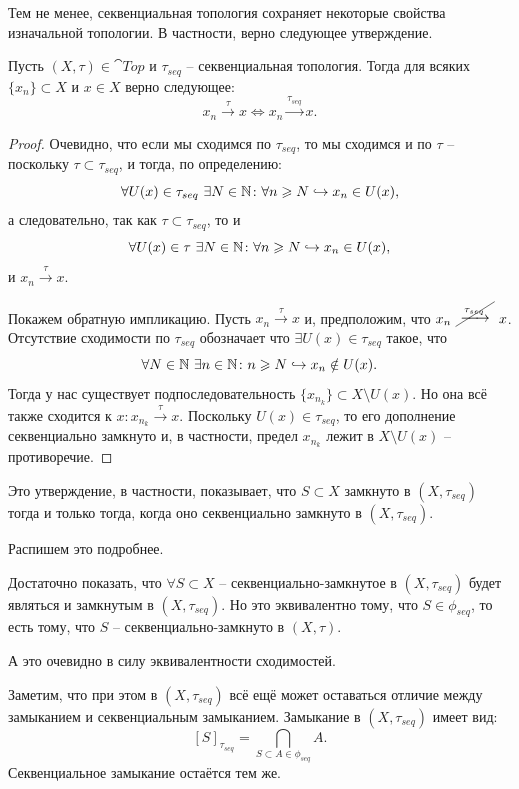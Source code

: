Тем не менее, секвенциальная топология сохраняет некоторые свойства изначальной топологии.
В частности, верно следующее утверждение.
\begin{proposition}
    Пусть $(X, \tau) \in \cat{Top}$ и $\tau_{seq}$ -- секвенциальная топология.
    Тогда для всяких $\{x_n\} \subset X$ и $x \in X$ верно следующее:
    \[
        x_n \xrightarrow{\tau} x \Longleftrightarrow x_n \xrightarrow{\tau_{seq}} x.
    \]
\end{proposition}
\begin{proof}
    Очевидно, что если мы сходимся по $\tau_{seq}$, то мы сходимся и по $\tau$ -- поскольку $\tau \subset \tau_{seq}$, и тогда, по определению:
    \[
        \forall U(x) \in \tau_{seq} \ \exists N \in \mathbb{N}\colon \forall n \geqslant N \hookrightarrow x_n \in U(x),
    \]
    а следовательно, так как $\tau \subset \tau_{seq}$, то и
    \[
        \forall U(x) \in \tau \ \exists N \in \mathbb{N} \colon \forall n \geqslant N \hookrightarrow x_n \in U(x),
    \]
    и $x_n \xrightarrow{\tau} x$.

    Покажем обратную импликацию.
    Пусть $x_n \xrightarrow{\tau} x$ и, предположим, что $x_n \xcancelrightarrow{\tau_{seq}} x$.
    Отсутствие сходимости по $\tau_{seq}$ обозначает что $\exists U(x) \in \tau_{seq}$ такое, что
    \[
        \forall N \in \mathbb{N} \ \exists n \in \mathbb{N}\colon n \geqslant N \hookrightarrow x_n \notin U(x).
    \]
    Тогда у нас существует подпоследовательность $\{x_{n_k}\} \subset X \setminus U(x)$.
    Но она всё также сходится к $x\colon x_{n_k} \xrightarrow{\tau} x$.
    Поскольку $U(x) \in \tau_{seq}$, то его дополнение секвенциально замкнуто и, в частности, предел $x_{n_k}$ лежит в $X \setminus U(x)$ -- противоречие.
\end{proof}
\begin{note}
    Это утверждение, в частности, показывает, что $S \subset X$ замкнуто в $(X, \tau_{seq})$ тогда и только тогда, когда оно секвенциально замкнуто в $(X, \tau_{seq})$.

    Распишем это подробнее.
    
    Достаточно показать, что $\forall S \subset X$ -- секвенциально-замкнутое в $(X, \tau_{seq})$ будет являться и замкнутым в $(X, \tau_{seq})$.
    Но это эквивалентно тому, что $S \in \phi_{seq}$, то есть тому, что $S$ -- секвенциально-замкнуто в $(X, \tau)$.

    А это очевидно в силу эквивалентности сходимостей.
\end{note}
\begin{note}
    Заметим, что при этом в $(X, \tau_{seq})$ всё ещё может оставаться отличие между замыканием и секвенциальным замыканием.
    Замыкание в $(X, \tau_{seq})$ имеет вид:
    \[
        [S]_{\tau_{seq}} = \bigcap_{S \subset A \in \phi_{seq}} A.
    \]
    Секвенциальное замыкание остаётся тем же.
\end{note}


